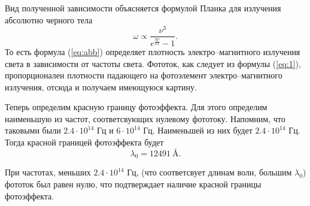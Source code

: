 \documentclass[12pt]{article}
\begin{document}
	Вид полученной зависимости объясняется формулой Планка для излучения абсолютно черного тела 
	\begin{equation}\label{eq:abb}
		\omega \propto \dfrac{\nu^3}{e^\frac{h\nu}{kT} - 1}.
	\end{equation}
	То есть формула (\ref{eq:abb}) определяет плотность электро\---магнитного излучения света в зависимости от частоты света. Фототок, как следует из формулы (\ref{eq:1}), пропорционален плотности падающего на фотоэлемент электро\---магнитного излучения, отсюда и получаем имеющуюся картину.
	\par Теперь определим красную границу фотоэффекта. Для этого определим наименьшую из частот, соответсвующих нулевому фототоку. Напомним, что таковыми были $2.4\cdot 10^{14}$ Гц и $6\cdot 10^{14}$ Гц. Наименьшей из них будет $2.4\cdot 10^{14}$ Гц. Тогда красной границей фотоэффекта будет 
	\begin{equation}
		\lambda_0 = 12491\ \text{\AA}.
	\end{equation}
	\par При частотах, меньших $2.4\cdot 10^{14}$ Гц, (что соответсвует длинам волн, большим $\lambda_0$) фототок был равен нулю, что подтверждает наличие красной границы фотоэффекта.
\end{document}
